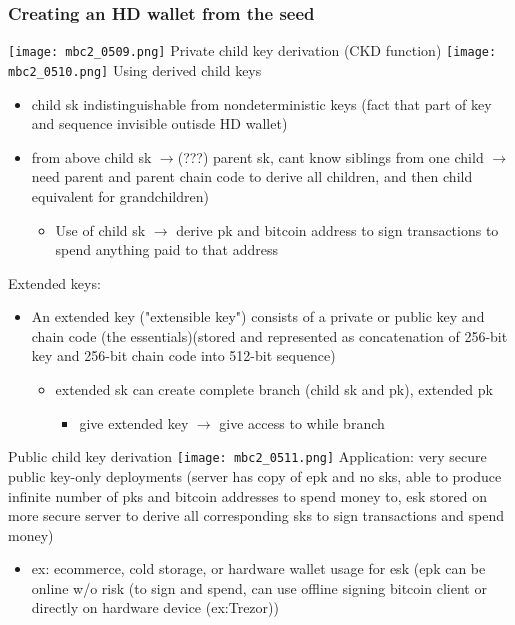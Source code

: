 \documentclass[english, 11pt]{article}
\begin{document}
\subsubsection{Creating an HD wallet from the seed}
\texttt{[image: mbc2\_0509.png]}
\newline
Private child key derivation (CKD function)
\newline
\texttt{[image: mbc2\_0510.png]}
\newline
Using derived child keys
\begin{itemize}
    \item child sk indistinguishable from nondeterministic keys (fact that part of key and sequence invisible outisde HD wallet)
    \item from above child sk $\rightarrow$(???) parent sk, cant know siblings from one child $\rightarrow$ need parent and parent chain code to derive all children, and then child equivalent for grandchildren)
    \begin{itemize}
        \item Use of child sk $\rightarrow$ derive pk and bitcoin address to sign transactions to spend anything paid to that address
    \end{itemize}
\end{itemize}
Extended keys:
\begin{itemize}
    \item An extended key ("extensible key") consists of a private or public key and chain code (the essentials)(stored and represented as concatenation of 256-bit key and 256-bit chain code into 512-bit sequence)
    \begin{itemize}
        \item extended sk can create complete branch (child sk and pk), extended pk 
        \begin{itemize}
            \item give extended key $\rightarrow$ give access to while branch 
        \end{itemize}
    \end{itemize}
\end{itemize}
Public child key derivation
\newline
\texttt{[image: mbc2\_0511.png]}
\newline
Application: very secure public key-only deployments (server has copy of epk and no sks, able to produce infinite number of pks and bitcoin addresses to spend money to, esk stored on more secure server to derive all corresponding sks to sign transactions and spend money)
\begin{itemize}
    \item ex: ecommerce, cold storage, or hardware wallet usage for esk (epk can be online w/o risk (to sign and spend, can use offline signing bitcoin client or directly on hardware device (ex:Trezor))
\end{itemize}
\end{document}
